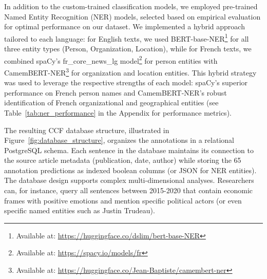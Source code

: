 \documentclass[12pt]{article}
\begin{document}
In addition to the custom-trained classification models, we employed pre-trained Named Entity Recognition (NER) models, selected based on empirical evaluation for optimal performance on our dataset. We implemented a hybrid approach tailored to each language: for English texts, we used BERT-base-NER\footnote{Available at: \url{https://huggingface.co/dslim/bert-base-NER}} for all three entity types (Person, Organization, Location), while for French texts, we combined spaCy's fr\_core\_news\_lg model\footnote{Available at: \url{https://spacy.io/models/fr}} for person entities with CamemBERT-NER\footnote{Available at: \url{https://huggingface.co/Jean-Baptiste/camembert-ner}} for organization and location entities. This hybrid strategy was used to leverage the respective strengths of each model: spaCy's superior performance on French person names and CamemBERT-NER's robust identification of French organizational and geographical entities (see Table~\ref{tab:ner_performance} in the Appendix for performance metrics).

The resulting CCF database structure, illustrated in Figure~\ref{fig:database_structure}, organizes the annotations in a relational PostgreSQL schema. Each sentence in the database maintains its connection to the source article metadata (publication, date, author) while storing the 65 annotation predictions as indexed boolean columns (or JSON for NER entities). The database design supports complex multi-dimensional analyses. Researchers can, for instance, query all sentences between 2015-2020 that contain economic frames with positive emotions and mention specific political actors (or even specific named entities such as Justin Trudeau).
\end{document}
